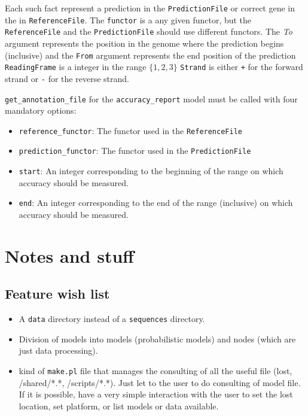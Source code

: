 \documentclass{book}
\begin{document}
Each such fact represent a prediction in the \texttt{PredictionFile} or
correct gene in the in \texttt{ReferenceFile}. 
The \texttt{functor} is a any given functor, but the
\texttt{ReferenceFile} and the \texttt{PredictionFile} should use
different functors. The \emph{To} argument represents the position in
the genome where the prediction begins (inclusive) and the
\texttt{From} argument represents the end position of the prediction
\texttt{ReadingFrame} is a integer in the range $\{1,2,3\}$
\texttt{Strand} is either \texttt{+} for the forward strand or
    \texttt{-} for the reverse strand. 

\texttt{get\_annotation\_file} for the \texttt{accuracy\_report} model
must be called with four mandatory options:
\begin{itemize}
\item \texttt{reference\_functor}: The functor used in the \texttt{ReferenceFile}
\item \texttt{prediction\_functor}: The functor used in the
  \texttt{PredictionFile}
\item \texttt{start}: An integer corresponding to the beginning of the range on which accuracy
  should be measured.
\item \texttt{end}: An integer corresponding to the end of the range
  (inclusive) on which accuracy should be measured.
\end{itemize}


\chapter{Notes and stuff}

\section{Feature wish list}

\begin{itemize}
\item A \texttt{data} directory instead of a \texttt{sequences}
  directory.
\item Division of models into models (probabilistic models) and nodes
  (which are just data processing).
\item kind of \texttt{make.pl} file that manages the consulting of all the
useful file (lost, /shared/*.*, /scripts/*.*). Just let to the user
to do consulting of model file. If it is possible, have a very simple
interaction with the user to set the lost location, set platform, or list
models or data available.
\end{itemize}



\printindex
\end{document}
